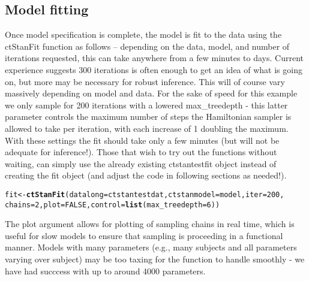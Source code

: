 \documentclass[nojss]{jss}\usepackage[]{graphicx}\usepackage[]{color}
\makeatletter
\newcommand{\hlnum}[1]{\textcolor[rgb]{0.686,0.059,0.569}{#1}}%
\newcommand{\hlstd}[1]{\textcolor[rgb]{0.345,0.345,0.345}{#1}}%
\newcommand{\hlkwb}[1]{\textcolor[rgb]{0.69,0.353,0.396}{#1}}%
\newcommand{\hlkwc}[1]{\textcolor[rgb]{0.333,0.667,0.333}{#1}}%
\newcommand{\hlkwd}[1]{\textcolor[rgb]{0.737,0.353,0.396}{\textbf{#1}}}%
\newenvironment{kframe}{%
 \def\at@end@of@kframe{}%
 \ifinner\ifhmode%
  \def\at@end@of@kframe{\end{minipage}}%
  \begin{minipage}{\columnwidth}%
 \fi\fi%
 \def\FrameCommand##1{\hskip\@totalleftmargin \hskip-\fboxsep
 \colorbox{shadecolor}{##1}\hskip-\fboxsep
     \hskip-\linewidth \hskip-\@totalleftmargin \hskip\columnwidth}%
 \MakeFramed {\advance\hsize-\width
   \@totalleftmargin\z@ \linewidth\hsize
   \@setminipage}}%
 {\par\unskip\endMakeFramed%
 \at@end@of@kframe}
\newenvironment{knitrout}{}{} %
\makeatother
\begin{document}
\subsection{Model fitting}
Once model specification is complete, the model is fit to the data using the ctStanFit function as follows -- depending on the data, model, and number of iterations requested, this can take anywhere from a few minutes to days. Current experience suggests 300 iterations is often enough to get an idea of what is going on, but more may be necessary for robust inference. This will of course vary massively depending on model and data. For the sake of speed for this example we only sample for 200 iterations with a lowered max\_treedepth - this latter parameter controls the maximum number of steps the Hamiltonian sampler is allowed to take per iteration, with each increase of 1 doubling the maximum. With these settings the fit should take only a few minutes (but will not be adequate for inference!). Those that wish to try out the functions without waiting, can simply use the already existing ctstantestfit object instead of creating the fit object (and adjust the code in following sections as needed!).

\begin{knitrout}\small
{}\color{fgcolor}\begin{kframe}
\begin{alltt}
\hlstd{fit}\hlkwb{<-}\hlkwd{ctStanFit}\hlstd{(}\hlkwc{datalong} \hlstd{= ctstantestdat,} \hlkwc{ctstanmodel} \hlstd{= model,} \hlkwc{iter}\hlstd{=}\hlnum{200}\hlstd{,}
  \hlkwc{chains}\hlstd{=}\hlnum{2}\hlstd{,} \hlkwc{plot}\hlstd{=}\hlnum{FALSE}\hlstd{,} \hlkwc{control}\hlstd{=}\hlkwd{list}\hlstd{(}\hlkwc{max_treedepth} \hlstd{=} \hlnum{6}\hlstd{))}
\end{alltt}
\end{kframe}
\end{knitrout}

The plot argument allows for plotting of sampling chains in real time, which is useful for slow models to ensure that sampling is proceeding in a functional manner. Models with many parameters (e.g., many subjects and all parameters varying over subject) may be too taxing for the function to handle smoothly - we have had succcess with up to around 4000 parameters.  
\end{document}
